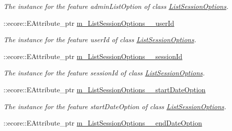 \begin{DoxyCompactItemize}
\begin{DoxyCompactList}\small\item\em The instance for the feature adminListOption of class \hyperlink{classUMS__Data_1_1ListSessionOptions}{ListSessionOptions}. \item\end{DoxyCompactList}\item 
\hypertarget{classUMS__Data_1_1UMS__DataPackage_a2d2c8d86c80ad70de8625267eb564d21}{
::ecore::EAttribute\_\-ptr \hyperlink{classUMS__Data_1_1UMS__DataPackage_a2d2c8d86c80ad70de8625267eb564d21}{m\_\-ListSessionOptions\_\-\_\-userId}}
\label{classUMS__Data_1_1UMS__DataPackage_a2d2c8d86c80ad70de8625267eb564d21}

\begin{DoxyCompactList}\small\item\em The instance for the feature userId of class \hyperlink{classUMS__Data_1_1ListSessionOptions}{ListSessionOptions}. \item\end{DoxyCompactList}\item 
\hypertarget{classUMS__Data_1_1UMS__DataPackage_a1fcc70054b1814759e5e493317c1848d}{
::ecore::EAttribute\_\-ptr \hyperlink{classUMS__Data_1_1UMS__DataPackage_a1fcc70054b1814759e5e493317c1848d}{m\_\-ListSessionOptions\_\-\_\-sessionId}}
\label{classUMS__Data_1_1UMS__DataPackage_a1fcc70054b1814759e5e493317c1848d}

\begin{DoxyCompactList}\small\item\em The instance for the feature sessionId of class \hyperlink{classUMS__Data_1_1ListSessionOptions}{ListSessionOptions}. \item\end{DoxyCompactList}\item 
\hypertarget{classUMS__Data_1_1UMS__DataPackage_a855b0aeb83e117bfef3ac78407480c87}{
::ecore::EAttribute\_\-ptr \hyperlink{classUMS__Data_1_1UMS__DataPackage_a855b0aeb83e117bfef3ac78407480c87}{m\_\-ListSessionOptions\_\-\_\-startDateOption}}
\label{classUMS__Data_1_1UMS__DataPackage_a855b0aeb83e117bfef3ac78407480c87}

\begin{DoxyCompactList}\small\item\em The instance for the feature startDateOption of class \hyperlink{classUMS__Data_1_1ListSessionOptions}{ListSessionOptions}. \item\end{DoxyCompactList}\item 
\hypertarget{classUMS__Data_1_1UMS__DataPackage_ad9d1c42a9e1d839fc445c45d0ce49608}{
::ecore::EAttribute\_\-ptr \hyperlink{classUMS__Data_1_1UMS__DataPackage_ad9d1c42a9e1d839fc445c45d0ce49608}{m\_\-ListSessionOptions\_\-\_\-endDateOption}}
\label{classUMS__Data_1_1UMS__DataPackage_ad9d1c42a9e1d839fc445c45d0ce49608}


\end{DoxyCompactItemize}
